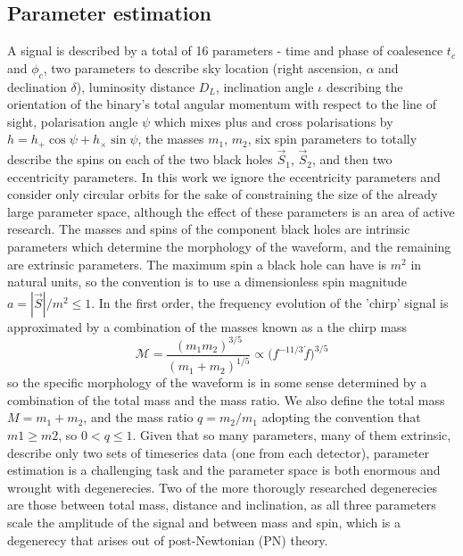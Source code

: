 \documentclass[11pt]{article}
\begin{document}
\subsection{Parameter estimation}
A signal is described by a total of 16 parameters\cite{props} - time and phase of coalesence $t_c$ and $\phi_c$, two parameters to describe sky location (right ascension, $\alpha$ and declination $\delta$), luminosity distance $D_L$, inclination angle $\iota$ describing the orientation of the binary's total angular momentum with respect to the line of sight, polarisation angle $\psi$ which mixes plus and cross polarisations by $h=h_+\cos\psi+h_\times\sin\psi$, the masses $m_1$, $m_2$, six spin parameters to totally describe the spins on each of the two black holes $\vec{S}_1$, $\vec{S}_2$, and then two eccentricity parameters. In this work we ignore the eccentricity parameters and consider only circular orbits for the sake of constraining the size of the already large parameter space, although the effect of these parameters is an area of active research. The masses and spins of the component black holes are intrinsic parameters which determine the morphology of the waveform, and the remaining are extrinsic parameters. The maximum spin a black hole can have is $m^2$ in natural units, so the convention is to use a dimensionless spin magnitude $a=|\vec{S}|/m^2 \leq 1$. In the first order, the frequency evolution of the 'chirp' signal is approximated by a combination of the masses known as a the chirp mass
\begin{equation}
\mathcal{M}=\frac{(m_1m_2)^{3/5}}{(m_1+m_2)^{1/5}}\propto \bigg(f^{-11/3}\dot{f}\bigg)^{3/5}
\end{equation}
so the specific morphology of the waveform is in some sense determined by a combination of the total mass and the mass ratio. We also define the total mass $M=m_1+m_2$, and the mass ratio $q=m_2/m_1$ adopting the convention that $m1\geq m2$, so $0<q\leq1$.
Given that so many parameters, many of them extrinsic, describe only two sets of timeseries data (one from each detector), parameter estimation is a challenging task and the parameter space is both enormous and wrought with degenerecies. Two of the more thorougly researched degenerecies are those between total mass, distance and inclination, as all three parameters scale the amplitude of the signal and between mass and spin\cite{spindegen}, which is a degenerecy that arises out of post-Newtonian (PN) theory. 
\end{document}
